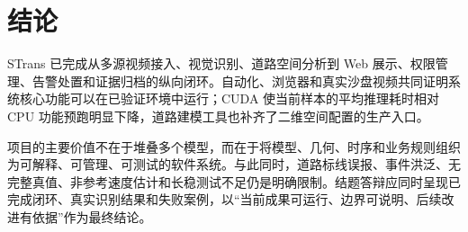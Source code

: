 \section{结论}\label{summary-ux7ed3ux8bba}

STrans 已完成从多源视频接入、视觉识别、道路空间分析到 Web 展示、权限管理、告警处置和证据归档的纵向闭环。自动化、浏览器和真实沙盘视频共同证明系统核心功能可以在已验证环境中运行；CUDA 使当前样本的平均推理耗时相对 CPU 功能预跑明显下降，道路建模工具也补齐了二维空间配置的生产入口。

项目的主要价值不在于堆叠多个模型，而在于将模型、几何、时序和业务规则组织为可解释、可管理、可测试的软件系统。与此同时，道路标线误报、事件洪泛、无完整真值、非参考速度估计和长稳测试不足仍是明确限制。结题答辩应同时呈现已完成闭环、真实识别结果和失败案例，以``当前成果可运行、边界可说明、后续改进有依据''作为最终结论。
